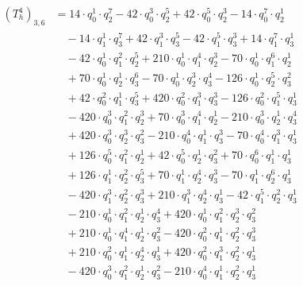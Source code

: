 \begin{align*}(T_{h}^4)_{3,6}&=14\cdot q_0^{1}\cdot q_2^{7}-42\cdot q_0^{3}\cdot q_2^{5}+42\cdot q_0^{5}\cdot q_2^{3}-14\cdot q_0^{7}\cdot q_2^{1}\\
&\quad -14\cdot q_1^{1}\cdot q_3^{7}+42\cdot q_1^{3}\cdot q_3^{5}-42\cdot q_1^{5}\cdot q_3^{3}+14\cdot q_1^{7}\cdot q_3^{1}\\
&\quad -42\cdot q_0^{1}\cdot q_1^{2}\cdot q_2^{5}+210\cdot q_0^{1}\cdot q_1^{4}\cdot q_2^{3}-70\cdot q_0^{1}\cdot q_1^{6}\cdot q_2^{1}\\
&\quad +70\cdot q_0^{1}\cdot q_2^{1}\cdot q_3^{6}-70\cdot q_0^{1}\cdot q_2^{3}\cdot q_3^{4}-126\cdot q_0^{1}\cdot q_2^{5}\cdot q_3^{2}\\
&\quad +42\cdot q_0^{2}\cdot q_1^{1}\cdot q_3^{5}+420\cdot q_0^{2}\cdot q_1^{3}\cdot q_3^{3}-126\cdot q_0^{2}\cdot q_1^{5}\cdot q_3^{1}\\
&\quad -420\cdot q_0^{3}\cdot q_1^{2}\cdot q_2^{3}+70\cdot q_0^{3}\cdot q_1^{4}\cdot q_2^{1}-210\cdot q_0^{3}\cdot q_2^{1}\cdot q_3^{4}\\
&\quad +420\cdot q_0^{3}\cdot q_2^{3}\cdot q_3^{2}-210\cdot q_0^{4}\cdot q_1^{1}\cdot q_3^{3}-70\cdot q_0^{4}\cdot q_1^{3}\cdot q_3^{1}\\
&\quad +126\cdot q_0^{5}\cdot q_1^{2}\cdot q_2^{1}+42\cdot q_0^{5}\cdot q_2^{1}\cdot q_3^{2}+70\cdot q_0^{6}\cdot q_1^{1}\cdot q_3^{1}\\
&\quad +126\cdot q_1^{1}\cdot q_2^{2}\cdot q_3^{5}+70\cdot q_1^{1}\cdot q_2^{4}\cdot q_3^{3}-70\cdot q_1^{1}\cdot q_2^{6}\cdot q_3^{1}\\
&\quad -420\cdot q_1^{3}\cdot q_2^{2}\cdot q_3^{3}+210\cdot q_1^{3}\cdot q_2^{4}\cdot q_3^{1}-42\cdot q_1^{5}\cdot q_2^{2}\cdot q_3^{1}\\
&\quad -210\cdot q_0^{1}\cdot q_1^{2}\cdot q_2^{1}\cdot q_3^{4}+420\cdot q_0^{1}\cdot q_1^{2}\cdot q_2^{3}\cdot q_3^{2}\\
&\quad +210\cdot q_0^{1}\cdot q_1^{4}\cdot q_2^{1}\cdot q_3^{2}-420\cdot q_0^{2}\cdot q_1^{1}\cdot q_2^{2}\cdot q_3^{3}\\
&\quad +210\cdot q_0^{2}\cdot q_1^{1}\cdot q_2^{4}\cdot q_3^{1}+420\cdot q_0^{2}\cdot q_1^{3}\cdot q_2^{2}\cdot q_3^{1}\\
&\quad -420\cdot q_0^{3}\cdot q_1^{2}\cdot q_2^{1}\cdot q_3^{2}-210\cdot q_0^{4}\cdot q_1^{1}\cdot q_2^{2}\cdot q_3^{1}\end{align*}
